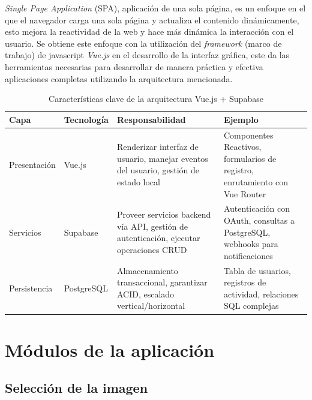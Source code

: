 \textit{Single Page Application} (SPA), aplicaci\'on de una sola p\'agina, es un enfoque en el que el navegador carga una sola p\'agina y actualiza el contenido din\'amicamente, esto mejora la reactividad de la web y hace m\'as din\'amica la interacci\'on con el usuario. Se obtiene este enfoque con la utilizaci\'on del \textit{framework} (marco de trabajo) de javascript \textit{Vue.js} \cite{vuejs} en el desarrollo de la interfaz gr\'afica, este  da las herramientas necesarias para desarrollar de manera pr\'actica y efectiva aplicaciones completas utilizando la arquitectura mencionada.


\begin{table}[ht]
	\centering
	\caption{Características clave de la arquitectura Vue.js + Supabase}
	\label{tab:arquitectura}
	\begin{tabular}{|p{2.1cm}|p{2cm}|p{5cm}|p{5cm}|} %
		\hline
		\rowcolor{gray!20} %
		\textbf{Capa} & \textbf{Tecnología} & \textbf{Responsabilidad} & \textbf{Ejemplo} \\
		\hline
		
		Presentación & Vue.js & 
		Renderizar interfaz de usuario, manejar eventos del usuario, gestión de estado local & 
		Componentes Reactivos, formularios de registro, enrutamiento con Vue Router \\
		\hline
		
		Servicios & Supabase & 
		Proveer servicios backend vía API, gestión de autenticación, ejecutar operaciones CRUD & 
		Autenticación con OAuth, consultas a PostgreSQL, webhooks para notificaciones \\
		\hline
		
		Persistencia & PostgreSQL & 
		Almacenamiento transaccional, garantizar ACID, escalado vertical/horizontal & 
		Tabla de usuarios, registros de actividad, relaciones SQL complejas \\
		\hline
	\end{tabular}
\end{table}


\section{M\'odulos de la aplicaci\'on}

\subsection{Selección de la imagen}
\label{subsec:seleccion-imagen}

